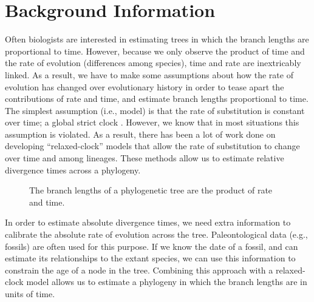 \documentclass{article}
\begin{document}
\section{Background Information}
Often biologists are interested in estimating trees in which the branch lengths
are proportional to time.
However, because we only observe the product of time and the rate of evolution
(differences among species), time and rate are inextricably linked.
As a result, we have to make some assumptions about how the rate of evolution
has changed over evolutionary history in order to tease apart the contributions
of rate and time, and estimate branch lengths proportional to time.
The simplest assumption (i.e., model) is that the rate of substitution is constant
over time; a global strict clock \citep{Zuckerkandl1962}.
However, we know that in most situations this assumption is violated.
As a result, there has been a lot of work done on developing ``relaxed-clock''
models that allow the rate of substitution to change over time and among
lineages.
These methods allow us to estimate relative divergence times across a phylogeny.

    \begin{figure}[htbp]
        \centering
        \caption{The branch lengths of a phylogenetic tree are the product of rate and time.}
        \label{fig:branchLengths}
    \end{figure}

In order to estimate absolute divergence times, we need extra information to
calibrate the absolute rate of evolution across the tree.
Paleontological data (e.g., fossils) are often used for this purpose.
If we know the date of a fossil, and can estimate its relationships to the
extant species, we can use this information to constrain the age of a node
in the tree.
Combining this approach with a relaxed-clock model allows us to estimate
a phylogeny in which the branch lengths are in units of time.
\end{document}
